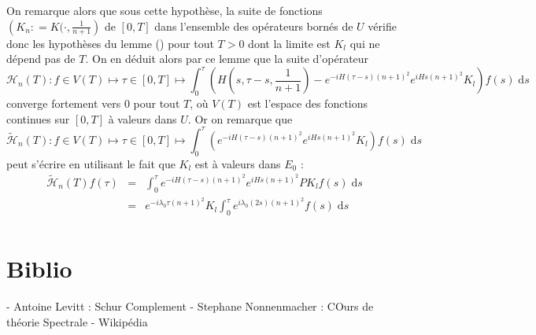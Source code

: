 \documentclass[12pt,openany,a4paper, titlepage]{article}
\newcommand{\f}[2]{\frac{#1}{#2}}
\newcommand{\lp}{\left(}
\newcommand{\rp}{\right)}
\newcommand{\dd}{\;\mathrm{d}}
\newcommand{\St}[2]{e^{-i #1 #2}}
\newcommand{\Stt}[2]{e^{i #1 #2}}
\theoremstyle{definition}
\theoremstyle{definition}
\theoremstyle{definition}
\theoremstyle{definition}
\theoremstyle{definition}
\theoremstyle{definition}
\begin{document}
On remarque alors que sous cette hypothèse, la suite de fonctions $\lp K_n : = K(\cdot,\f{1}{n+1}\rp$ de $[0,T]$ dans l'ensemble des opérateurs bornés de $U$ vérifie donc les hypothèses du lemme () pour tout $T>0$ dont la limite est $K_l$ qui ne dépend pas de $T$. On en déduit alors par ce lemme que la suite d'opérateur
\begin{equation}
    \mathcal{H}_n(T) : f\in V(T) \mapsto \tau\in[0,T] \mapsto \int_0^\tau \lp H(s,\tau - s, \f{1}{n+1}) - \St{H}{(\tau-s)(n+1)^2}\Stt{H}{s(n+1)^2} K_l \rp f(s) \dd s 
\end{equation}
converge fortement vers $0$ pour tout $T$, où $V(T)$ est l'espace des fonctions continues sur $[0,T]$ à valeurs dans $U$. Or on remarque que
\begin{equation}
    \tilde{\mathcal{H}}_n(T) : f\in V(T) \mapsto \tau\in[0,T] \mapsto \int_0^\tau \lp \St{H}{(\tau-s)(n+1)^2}\Stt{H}{s(n+1)^2} K_l \rp f(s) \dd s
\end{equation}
peut s'écrire en utilisant le fait que $K_l$ est à valeurs dans $E_0$ :
\begin{eqnarray}
    \tilde{\mathcal{H}}_n(T)f(\tau) &=& \int_0^\tau \St{H}{(\tau-s)(n+1)^2}\Stt{H}{s(n+1)^2} P K_l f(s)\dd s \\
                                    &=& \St{\lambda_0}{\tau(n+1)^2}K_l \int_0^\tau \Stt{\lambda_0}{(2s)(n+1)^2} f(s) \dd s \\
\end{eqnarray}




\newpage

\appendix
\appendixpage
\addappheadtotoc

\section{Biblio}

- Antoine Levitt : Schur Complement
- Stephane Nonnenmacher : COurs de théorie Spectrale
- Wikipédia %
\cite{HOWLAND1975415}
\printbibliography
\end{document}
